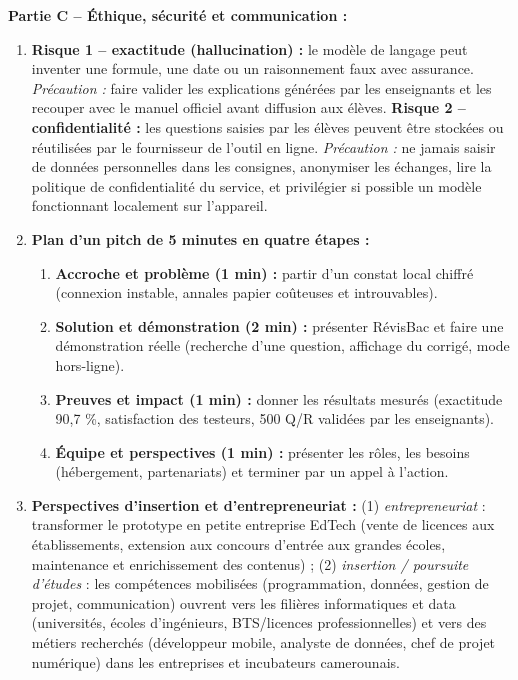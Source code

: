 \documentclass[11pt]{article}
\begin{document}
\begin{corrige}
\textbf{Partie C -- Éthique, sécurité et communication :}
\begin{enumerate}
\item \textbf{Risque 1 -- exactitude (hallucination) :} le modèle de langage peut inventer une formule, une date ou un raisonnement faux avec assurance. \emph{Précaution :} faire valider les explications générées par les enseignants et les recouper avec le manuel officiel avant diffusion aux élèves. \textbf{Risque 2 -- confidentialité :} les questions saisies par les élèves peuvent être stockées ou réutilisées par le fournisseur de l'outil en ligne. \emph{Précaution :} ne jamais saisir de données personnelles dans les consignes, anonymiser les échanges, lire la politique de confidentialité du service, et privilégier si possible un modèle fonctionnant localement sur l'appareil.
\item \textbf{Plan d'un pitch de 5 minutes en quatre étapes :}
\begin{enumerate}
\item \textbf{Accroche et problème (1 min) :} partir d'un constat local chiffré (connexion instable, annales papier coûteuses et introuvables).
\item \textbf{Solution et démonstration (2 min) :} présenter RévisBac et faire une démonstration réelle (recherche d'une question, affichage du corrigé, mode hors-ligne).
\item \textbf{Preuves et impact (1 min) :} donner les résultats mesurés (exactitude 90,7 \%, satisfaction des testeurs, 500 Q/R validées par les enseignants).
\item \textbf{Équipe et perspectives (1 min) :} présenter les rôles, les besoins (hébergement, partenariats) et terminer par un appel à l'action.
\end{enumerate}
\item \textbf{Perspectives d'insertion et d'entrepreneuriat :} (1) \emph{entrepreneuriat} : transformer le prototype en petite entreprise EdTech (vente de licences aux établissements, extension aux concours d'entrée aux grandes écoles, maintenance et enrichissement des contenus) ; (2) \emph{insertion / poursuite d'études} : les compétences mobilisées (programmation, données, gestion de projet, communication) ouvrent vers les filières informatiques et data (universités, écoles d'ingénieurs, BTS/licences professionnelles) et vers des métiers recherchés (développeur mobile, analyste de données, chef de projet numérique) dans les entreprises et incubateurs camerounais.
\end{enumerate}


\end{corrige}
\end{document}
